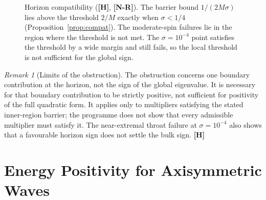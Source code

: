 \documentclass[11pt,a4paper]{article}
\newcommand{\VN}{\textcolor{vn}{\textbf{[N-R]}}}
\newcommand{\VH}{\textcolor{vh}{\textbf{[H]}}}
\theoremstyle{remark}
\newtheorem{remark}[theorem]{Remark}
\theoremstyle{definition}
\begin{document}
\begin{figure}[H]
\centering
{}
\caption{Horizon compatibility (\VH, \VN). The barrier bound $1/(2M\sigma)$ lies above the threshold $2/M$ exactly when $\sigma < 1/4$ (Proposition~\ref{prop:compat}). The moderate-spin failures lie in the region where the threshold is not met. The $\sigma = 10^{-4}$ point satisfies the threshold by a wide margin and still fails, so the local threshold is not sufficient for the global sign.}
\label{fig:horizon}
\end{figure}

\begin{remark}[Limits of the obstruction]
The obstruction concerns one boundary contribution at the horizon, not the sign of the global eigenvalue. It is necessary for that boundary contribution to be strictly positive, not sufficient for positivity of the full quadratic form. It applies only to multipliers satisfying the stated inner-region barrier; the programme does not show that every admissible multiplier must satisfy it. The near-extremal throat failure at $\sigma=10^{-4}$ also shows that a favourable horizon sign does not settle the bulk sign. \VH
\end{remark}

\section{Energy Positivity for Axisymmetric Waves}
\label{sec:energy}
\end{document}
